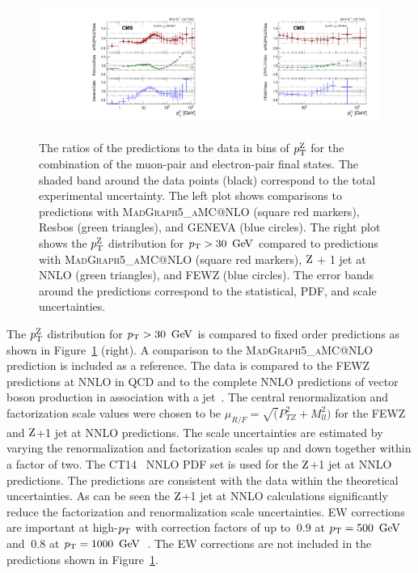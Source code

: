 \begin{figure}
	\centering
	\includegraphics[width=0.49\textwidth]{figures/zpt/zll_ressum_ratio.pdf}
	\includegraphics[width=0.49\textwidth]{figures/zpt/zll_fixed_ratio.pdf}
	\caption{The ratios of the predictions to the data in bins of $p_{\mathrm{T}}^{\mathrm{Z}}$ for the combination of the muon-pair and electron-pair final states. The shaded band around the data points (black) correspond to the total experimental uncertainty. The left plot shows comparisons to predictions with \textsc{MadGraph5\_aMC@NLO} (square red markers),  Resbos (green triangles), and GENEVA (blue circles). The right plot shows the  $p_{\mathrm{T}}^{\mathrm{Z}}$ distribution for $p_{\mathrm{T}}>30~\,\text{Ge\hspace{-.08em}V}$ compared to predictions with \textsc{MadGraph5\_aMC@NLO} (square red markers),  $\mathrm{Z}$ + 1 jet at NNLO (green triangles), and FEWZ (blue circles). The error bands around the predictions correspond to the statistical, PDF, and scale uncertainties.}
	\label{fig:unf_pt_fixed}
\end{figure}  

The $p_{\mathrm{T}}^{\mathrm{Z}}$ distribution for $p_{\mathrm{T}}>30~\,\text{Ge\hspace{-.08em}V}$ is compared to fixed order 
predictions as shown in Figure~\ref{fig:unf_pt_fixed} (right). A comparison to 
the \textsc{MadGraph5\_aMC@NLO} prediction is included as a reference. The 
data is compared to the FEWZ predictions at NNLO in QCD and to the complete 
NNLO predictions of vector boson production in association with a 
jet~\cite{Boughezal:2015ded,Boughezal:2015dva}. The central renormalization 
and factorization scale values were chosen to be 
$\mu_{R/F}=\sqrt(P_{TZ}^2+M_{ll}^{2})$ for the FEWZ and $\mathrm{Z}$+1 jet at NNLO 
predictions. The scale uncertainties are estimated by varying the 
renormalization and factorization scales up and down together within a factor 
of two. The CT14~\cite{Dulat:2015mca} NNLO PDF set is used for the $\mathrm{Z}$+1 jet 
at NNLO predictions. The predictions are consistent with the data within the 
theoretical uncertainties. As can be seen the $\mathrm{Z}$+1 jet at NNLO calculations 
significantly reduce the factorization and renormalization scale uncertainties. 
EW corrections are important at high-$p_{\mathrm{T}}$ with correction factors of up to 
$~0.9$ at $p_{\mathrm{T}}=500~\,\text{Ge\hspace{-.08em}V}$ and $~0.8$ at 
$p_{\mathrm{T}}=1000~\,\text{Ge\hspace{-.08em}V}$~\cite{Dittmaier:2014qza,Lindert:2017olm}. 
The EW corrections are not included in the predictions shown in 
Figure~\ref{fig:unf_pt_fixed}.


